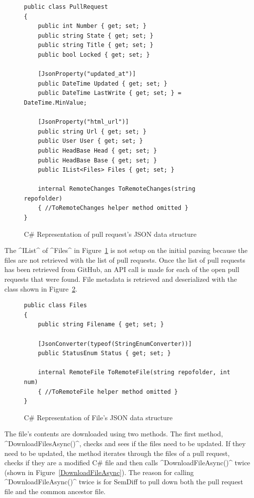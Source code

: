 \documentclass[draftclsnofoot,onecolumn]{IEEEtran}
\begin{document}
\begin{figure}[p]
\centering
\begin{lstlisting}
public class PullRequest
{
 	public int Number { get; set; }
    public string State { get; set; }
    public string Title { get; set; }
    public bool Locked { get; set; }
    
	[JsonProperty("updated_at")]
    public DateTime Updated { get; set; }
    public DateTime LastWrite { get; set; } = DateTime.MinValue;
    
	[JsonProperty("html_url")]
    public string Url { get; set; }
    public User User { get; set; }
    public HeadBase Head { get; set; }
    public HeadBase Base { get; set; }
    public IList<Files> Files { get; set; }
	
    internal RemoteChanges ToRemoteChanges(string repofolder)
    { //ToRemoteChanges helper method omitted }
}
\end{lstlisting}
\caption{C\# Representation of pull request's JSON data structure}
\label{PullRequestCode}
\end{figure}

The ^IList^ of ^Files^ in Figure~\ref{PullRequestCode} is not setup on the 
initial parsing because the files are not retrieved with the list of pull 
requests. Once the list of pull requests has been retrieved from GitHub, an API 
call is made for each of the open pull requests that were found. File metadata 
is retrieved and deserialized with the class shown in Figure~\ref{GitHubFiles}. 

\begin{figure}[p]
\centering
\begin{lstlisting}
public class Files
{
    public string Filename { get; set; }
	
    [JsonConverter(typeof(StringEnumConverter))]
    public StatusEnum Status { get; set; }
	
    internal RemoteFile ToRemoteFile(string repofolder, int num)	
    { //ToRemoteFile helper method omitted }
}
\end{lstlisting}
\caption{ C\# Representation of File's JSON data structure}
\label{GitHubFiles}
\end{figure}

The file's contents are downloaded using two methods. The first method, 
^DownloadFilesAsync()^, checks and sees if the files need to be 
updated. If they need to be updated, the method iterates through the files of 
a pull request, checks if they are a modified C\# file and then calls 
^DownloadFileAsync()^ twice (shown in Figure~\ref{DownloadFileAsync}). The 
reason for calling ^DownloadFileAsync()^ twice is for SemDiff to pull down 
both the pull request file and the common ancestor file. 
\end{document}
